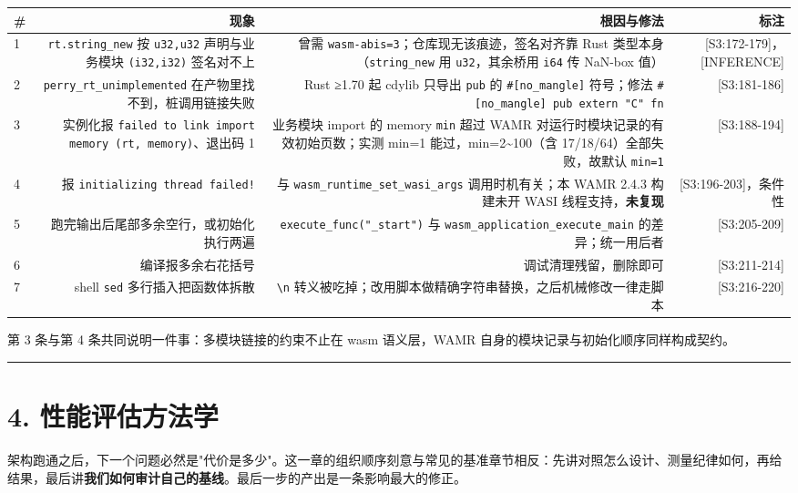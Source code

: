 \documentclass[11pt, a4paper]{article}
\begin{document}
\begin{center}\small\begin{tabular}{lrrr}
\toprule
\# & 现象 & 根因与修法 & 标注 \\
\midrule
1 & \texttt{rt.string\_new} 按 \texttt{u32,u32} 声明与业务模块 \texttt{(i32,i32)} 签名对不上 & 曾需 \texttt{wasm-abis=3}；仓库现无该痕迹，签名对齐靠 Rust 类型本身（\texttt{string\_new} 用 \texttt{u32}，其余桥用 \texttt{i64} 传 NaN-box 值） & [S3:172-179]，[INFERENCE] \\
2 & \texttt{perry\_rt\_unimplemented} 在产物里找不到，桩调用链接失败 & Rust ≥1.70 起 cdylib 只导出 \texttt{pub} 的 \texttt{\#[no\_mangle]} 符号；修法 \texttt{\#[no\_mangle] pub extern "C" fn} & [S3:181-186] \\
3 & 实例化报 \texttt{failed to link import memory (rt, memory)}、退出码 1 & 业务模块 import 的 memory \texttt{min} 超过 WAMR 对运行时模块记录的有效初始页数；实测 min=1 能过，min=2\textasciitilde{}100（含 17/18/64）全部失败，故默认 \texttt{min=1} & [S3:188-194] \\
4 & 报 \texttt{initializing thread failed!} & 与 \texttt{wasm\_runtime\_set\_wasi\_args} 调用时机有关；本 WAMR 2.4.3 构建未开 WASI 线程支持，\textbf{未复现} & [S3:196-203]，条件性 \\
5 & 跑完输出后尾部多余空行，或初始化执行两遍 & \texttt{execute\_func("\_start")} 与 \texttt{wasm\_application\_execute\_main} 的差异；统一用后者 & [S3:205-209] \\
6 & 编译报多余右花括号 & 调试清理残留，删除即可 & [S3:211-214] \\
7 & shell \texttt{sed} 多行插入把函数体拆散 & \texttt{\textbackslash{}n} 转义被吃掉；改用脚本做精确字符串替换，之后机械修改一律走脚本 & [S3:216-220] \\
\bottomrule
\end{tabular}\end{center}


第 3 条与第 4 条共同说明一件事：多模块链接的约束不止在 wasm 语义层，WAMR 自身的模块记录与初始化顺序同样构成契约。


\bigskip\hrule\bigskip

\section{4. 性能评估方法学}

架构跑通之后，下一个问题必然是"代价是多少"。这一章的组织顺序刻意与常见的基准章节相反：先讲对照怎么设计、测量纪律如何，再给结果，最后讲\textbf{我们如何审计自己的基线}。最后一步的产出是一条影响最大的修正。
\end{document}
